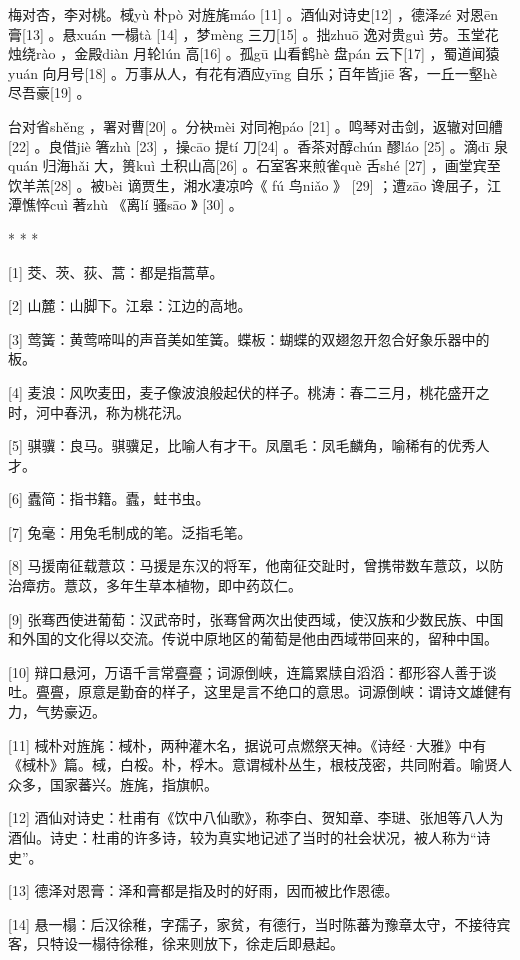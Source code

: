 \documentclass[12pt,UTF8]{ctexbook}
\begin{document}
梅对杏，李对桃。棫yù 朴pò 对旌旄máo [11] 。酒仙对诗史[12] ，德泽zé 对恩ēn 膏[13] 。悬xuán 一榻tà [14] ，梦mèng 三刀[15] 。拙zhuō 逸对贵guì 劳。玉堂花烛绕rào ，金殿diàn 月轮lún 高[16] 。孤gū 山看鹤hè 盘pán 云下[17] ，蜀道闻猿yuán 向月号[18] 。万事从人，有花有酒应yīng 自乐；百年皆jiē 客，一丘一壑hè 尽吾豪[19] 。

台对省shěng ，署对曹[20] 。分袂mèi 对同袍páo [21] 。鸣琴对击剑，返辙对回艚[22] 。良借jiè 箸zhù [23] ，操cāo 提tí 刀[24] 。香茶对醇chún 醪láo [25] 。滴dī 泉quán 归海hǎi 大，篑kuì 土积山高[26] 。石室客来煎雀què 舌shé [27] ，画堂宾至饮羊羔[28] 。被bèi 谪贾生，湘水凄凉吟《 fú 鸟niǎo 》 [29] ；遭zāo 谗屈子，江潭憔悴cuì 著zhù 《离lí 骚sāo 》 [30] 。



* * *



[1] 茭、茨、荻、蒿：都是指蒿草。

[2] 山麓：山脚下。江皋：江边的高地。

[3] 莺簧：黄莺啼叫的声音美如笙簧。蝶板：蝴蝶的双翅忽开忽合好象乐器中的板。

[4] 麦浪：风吹麦田，麦子像波浪般起伏的样子。桃涛：春二三月，桃花盛开之时，河中春汛，称为桃花汛。

[5] 骐骥：良马。骐骥足，比喻人有才干。凤凰毛：凤毛麟角，喻稀有的优秀人才。

[6] 蠹简：指书籍。蠹，蛀书虫。

[7] 兔毫：用兔毛制成的笔。泛指毛笔。

[8] 马援南征载薏苡：马援是东汉的将军，他南征交趾时，曾携带数车薏苡，以防治瘴疠。薏苡，多年生草本植物，即中药苡仁。

[9] 张骞西使进葡萄：汉武帝时，张骞曾两次出使西域，使汉族和少数民族、中国和外国的文化得以交流。传说中原地区的葡萄是他由西域带回来的，留种中国。

[10] 辩口悬河，万语千言常亹亹；词源倒峡，连篇累牍自滔滔：都形容人善于谈吐。亹亹，原意是勤奋的样子，这里是言不绝口的意思。词源倒峡：谓诗文雄健有力，气势豪迈。

[11] 棫朴对旌旄：棫朴，两种灌木名，据说可点燃祭天神。《诗经·大雅》中有《棫朴》篇。棫，白桵。朴，桴木。意谓棫朴丛生，根枝茂密，共同附着。喻贤人众多，国家蕃兴。旌旄，指旗帜。

[12] 酒仙对诗史：杜甫有《饮中八仙歌》，称李白、贺知章、李琎、张旭等八人为酒仙。诗史：杜甫的许多诗，较为真实地记述了当时的社会状况，被人称为“诗史”。

[13] 德泽对恩膏：泽和膏都是指及时的好雨，因而被比作恩德。

[14] 悬一榻：后汉徐稚，字孺子，家贫，有德行，当时陈蕃为豫章太守，不接待宾客，只特设一榻待徐稚，徐来则放下，徐走后即悬起。
\end{document}
